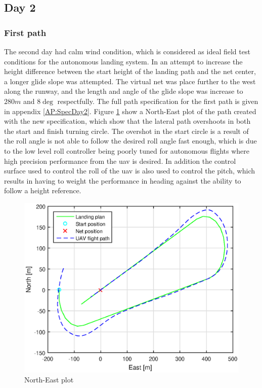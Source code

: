 \subsection{Day 2}
\subsubsection{First path}
The second day had calm wind condition, which is considered as ideal field test conditions for the autonomous landing system. In an attempt to increase the height difference between the start height of the landing path and the net center, a longer glide slope was attempted. The virtual net was place further to the west along the runway, and the length and angle of the glide slope was increase to $280 m$ and $8 \deg$ respectfully. The full path specification for the first path is given in appendix \ref{AP:SpecDay2}. Figure \ref{Fig:NorthEast1juni081328} show a North-East plot of the path created with the new specification, which show that the lateral path overshoots in both the start and finish turning circle. The overshot in the start circle is a result of the roll angle is not able to follow the desired roll angle fast enough, which is due to the low level roll controller being poorly tuned for autonomous flights where high precision performance from the \gls{uav} is desired. In addition the control surface used to control the roll of the \gls{uav} is also used to control the pitch, which results in having to weight the performance in heading against the ability to follow a height reference.
\begin{figure}[H]
\centering
\includegraphics[scale=0.7]{figs/Experiment/NorthEast1juni081328.eps}
\caption{North-East plot}
\label{Fig:NorthEast1juni081328}
\end{figure}
